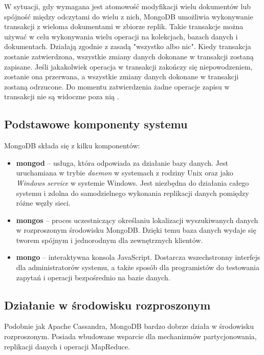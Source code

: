 W sytuacji, gdy wymagana jest atomowość modyfikacji wielu dokumentów lub spójność między odczytami do wielu z nich, MongoDB umożliwia wykonywanie transakcji z wieloma dokumentami w zbiorze replik.
Takie transakcje można używać w celu wykonywania wielu operacji na kolekcjach, bazach danych i dokumentach.
Działają zgodnie z zasadą "wszystko albo nic".
Kiedy transakcja zostanie zatwierdzona, wszystkie zmiany danych dokonane w transakcji zostaną zapisane.
Jeśli jakakolwiek operacja w transakcji zakończy się niepowodzeniem, zostanie ona przerwana, a wszystkie zmiany danych dokonane w transakcji zostaną odrzucone.
Do momentu zatwierdzenia żadne operacje zapisu w transakcji nie są widoczne poza nią \cite{MongoDBTransactions}.

\subsection{Podstawowe komponenty systemu}

MongoDB składa się z kilku komponentów:
\begin{itemize}
    \item \textbf{mongod} -- usługa, która odpowiada za działanie bazy danych.
    Jest uruchamiana w trybie \textit{daemon} w systemach z rodziny Unix oraz jako \textit{Windows service} w  systemie Windows.
    Jest niezbędna do działania całego systemu i zdolna do samodzielnego wykonania replikacji danych pomiędzy różne węzły sieci.
    \item \textbf{mongos} -- proces uczestniczący określaniu lokalizacji wyszukiwanych danych w rozproszonym środowisku MongoDB.
    Dzięki temu baza danych wydaje się tworem spójnym i jednorodnym dla zewnętrznych klientów.
    \item \textbf{mongo} -- interaktywna konsola JavaScript.
    Dostarcza wszechstronny interfejs dla administratorów systemu, a także sposób dla programistów do testowania zapytań i operacji bezpośrednio na bazie danych.
\end{itemize}

\subsection{Działanie w środowisku rozproszonym}

Podobnie jak Apache Cassandra, MongoDB bardzo dobrze działa w środowisku rozproszonym.
Posiada wbudowane wsparcie dla mechanizmów partycjonowania, replikacji danych i operacji MapReduce.

